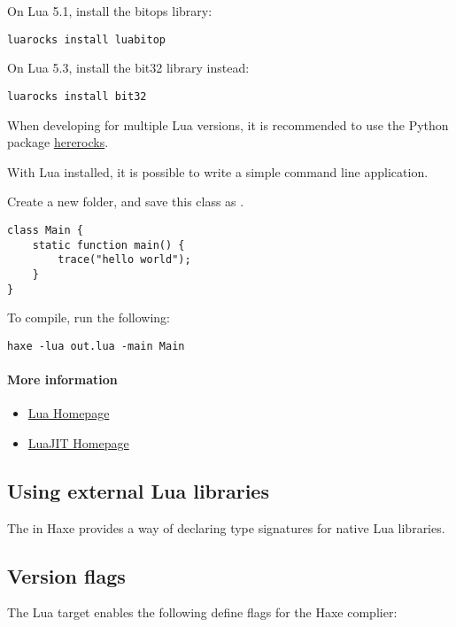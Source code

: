 On Lua 5.1, install the bitops library:
\begin{lstlisting}
luarocks install luabitop
\end{lstlisting}

On Lua 5.3, install the bit32 library instead:
\begin{lstlisting}
luarocks install bit32
\end{lstlisting}

When developing for multiple Lua versions, it is recommended to use
the Python package \href{https://github.com/mpeterv/hererocks}{hererocks}.

With Lua installed, it is possible to write a simple command line application.

Create a new folder, and save this class as .

\begin{lstlisting}
class Main {
    static function main() {
        trace("hello world");
    }
}
\end{lstlisting}

To compile, run the following:
\begin{lstlisting}
haxe -lua out.lua -main Main
\end{lstlisting}

\paragraph{More information}
\begin{itemize}
	\item \href{https://www.lua.org/}{Lua Homepage}
	\item \href{http://luajit.org/}{LuaJIT Homepage}
\end{itemize}

\subsection{Using external Lua libraries}
\label{target-lua-external-libraries}

The  in Haxe provides a way of declaring type signatures
for native Lua libraries.

\subsection{Version flags}
\label{target-lua-flags}

The Lua target enables the following define flags for the Haxe complier:

